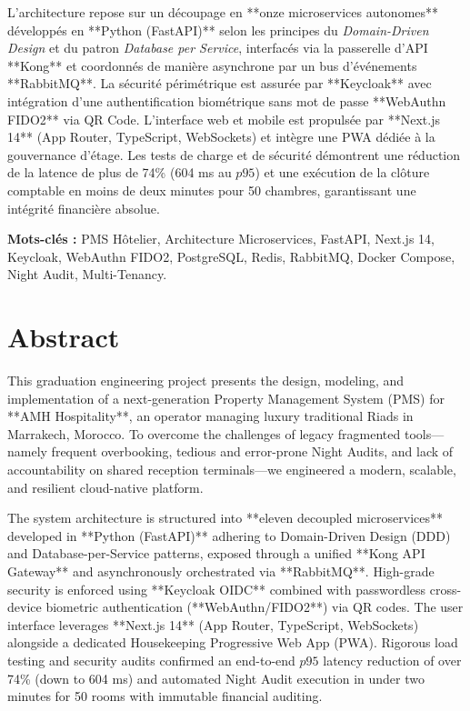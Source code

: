 L'architecture repose sur un découpage en **onze microservices autonomes** développés en **Python (FastAPI)** selon les principes du \textit{Domain-Driven Design} et du patron \textit{Database per Service}, interfacés via la passerelle d'API **Kong** et coordonnés de manière asynchrone par un bus d'événements **RabbitMQ**. La sécurité périmétrique est assurée par **Keycloak** avec intégration d'une authentification biométrique sans mot de passe **WebAuthn FIDO2** via QR Code. L'interface web et mobile est propulsée par **Next.js 14** (App Router, TypeScript, WebSockets) et intègre une PWA dédiée à la gouvernance d'étage. Les tests de charge et de sécurité démontrent une réduction de la latence de plus de 74\% (604 ms au $p95$) et une exécution de la clôture comptable en moins de deux minutes pour 50 chambres, garantissant une intégrité financière absolue.

\vspace{0.8cm}
\noindent\textbf{Mots-clés :} PMS Hôtelier, Architecture Microservices, FastAPI, Next.js 14, Keycloak, WebAuthn FIDO2, PostgreSQL, Redis, RabbitMQ, Docker Compose, Night Audit, Multi-Tenancy.

\clearpage

\chapter*{Abstract}

This graduation engineering project presents the design, modeling, and implementation of a next-generation Property Management System (PMS) for **AMH Hospitality**, an operator managing luxury traditional Riads in Marrakech, Morocco. To overcome the challenges of legacy fragmented tools—namely frequent overbooking, tedious and error-prone Night Audits, and lack of accountability on shared reception terminals—we engineered a modern, scalable, and resilient cloud-native platform.

The system architecture is structured into **eleven decoupled microservices** developed in **Python (FastAPI)** adhering to Domain-Driven Design (DDD) and Database-per-Service patterns, exposed through a unified **Kong API Gateway** and asynchronously orchestrated via **RabbitMQ**. High-grade security is enforced using **Keycloak OIDC** combined with passwordless cross-device biometric authentication (**WebAuthn/FIDO2**) via QR codes. The user interface leverages **Next.js 14** (App Router, TypeScript, WebSockets) alongside a dedicated Housekeeping Progressive Web App (PWA). Rigorous load testing and security audits confirmed an end-to-end $p95$ latency reduction of over 74\% (down to 604 ms) and automated Night Audit execution in under two minutes for 50 rooms with immutable financial auditing.

